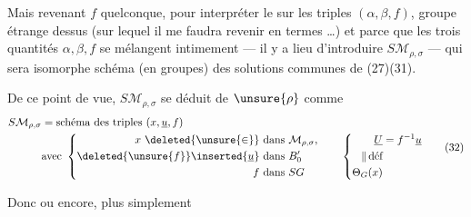 Mais revenant  $f$ quelconque, pour interpréter le   sur les triples $(\alpha,\beta,f)$,   groupe étrange dessus  (sur lequel il me faudra revenir en termes  \ldots) et parce que les trois quantités $\alpha,\beta,f$ se mélangent intimement --- il y a lieu d'introduire $S\mathcal M_{\rho,\sigma}$ --- qui sera isomorphe  schéma (en groupes) des solutions communes de (27)(31).

De ce point de vue, $S\mathcal M_{\rho,\sigma}$ se déduit de $\unsure{\rho}$ comme  
\[
\begin{aligned}
S\mathcal M_{\rho,\sigma}&=\text{schéma des triples }(x,\underline u,f)\\
&\text{avec }\left\{
\begin{aligned}
x\ \deleted{\unsure{\in}}&\text{ dans }\mathcal M_{\rho,\sigma},\\
\deleted{\unsure{f}}\inserted{\underline u}&\text{ dans }B'_0\\
f&\text{ dans }SG
\end{aligned}
\right.
\qquad\left\{
\begin{aligned}
\underline U&=f^{-1}\underline u\\
\Vert\,\text{déf}&\\
\Theta_G(x)&
\end{aligned}\right.
\end{aligned}\tag{32}
\]

Donc
ou encore, plus simplement

